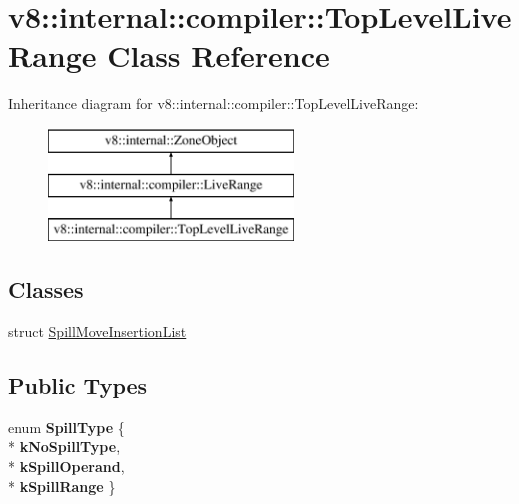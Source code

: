 \hypertarget{classv8_1_1internal_1_1compiler_1_1_top_level_live_range}{}\section{v8\+:\+:internal\+:\+:compiler\+:\+:Top\+Level\+Live\+Range Class Reference}
\label{classv8_1_1internal_1_1compiler_1_1_top_level_live_range}
Inheritance diagram for v8\+:\+:internal\+:\+:compiler\+:\+:Top\+Level\+Live\+Range\+:\begin{figure}[H]
\begin{center}
\leavevmode
\includegraphics[height=3.000000cm]{classv8_1_1internal_1_1compiler_1_1_top_level_live_range}
\end{center}
\end{figure}
\subsection*{Classes}
\begin{DoxyCompactItemize}
\item 
struct \hyperlink{structv8_1_1internal_1_1compiler_1_1_top_level_live_range_1_1_spill_move_insertion_list}{Spill\+Move\+Insertion\+List}
\end{DoxyCompactItemize}
\subsection*{Public Types}
\begin{DoxyCompactItemize}
\item 
enum {\bfseries Spill\+Type} \{ \\*
{\bfseries k\+No\+Spill\+Type}, 
\\*
{\bfseries k\+Spill\+Operand}, 
\\*
{\bfseries k\+Spill\+Range}
 \}\hypertarget{classv8_1_1internal_1_1compiler_1_1_top_level_live_range_a3de181c0abbe3c9a93b1423b9553e6cd}{}\label{classv8_1_1internal_1_1compiler_1_1_top_level_live_range_a3de181c0abbe3c9a93b1423b9553e6cd}

\end{DoxyCompactItemize}
